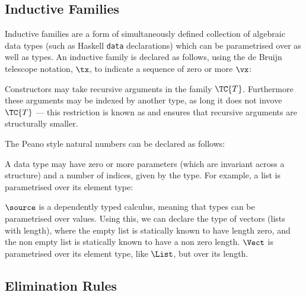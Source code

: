 \subsection{Inductive Families}

\label{indfamilies}

Inductive families \cite{dybjer94} are a form of simultaneously
defined collection of algebraic data types (such as Haskell
\texttt{data} declarations) which can be parametrised over
 as well as types.  An inductive family is declared as
follows, using the de Bruijn telescope notation, $\tx$, to indicate a
sequence of zero or more $\vx$:


Constructors may take recursive arguments in the family
$\TC{T}$. Furthermore these arguments may be indexed by another type,
as long it does not invove $\TC{T}$ --- this restriction is known as
 and ensures that recursive arguments are
structurally smaller.

The Peano style natural numbers can be declared as follows:

\DM{
\Data\:\Nat\Hab\Type\:=\:\Z\Hab\Nat\:\mid\:\suc\Hab\fbind{\vk}{\Nat}{\Nat}
}

A data type may have zero or more parameters (which are invariant
across a structure) and a number of indices, given by the type. For
example, a list is parametrised over its element type:

\DM{
\AR{
\Data\:\List\:(\vA\Hab\Type)\Hab\Type\:
\AR{
=\:\nil\Hab\List\:\vA\\
\mid\:\cons\Hab\fbind{\vx}{\vA}{\fbind{\vxs}{\List\:\vA}{\List\:\vA}}
}
}
}

$\source$ is a dependently typed calculus, meaning that types can be
parametrised over values. Using this, we can declare the type of
vectors (lists with length), where the empty list is statically known
to have length zero, and the non empty list is statically known to
have a non zero length. $\Vect$ is parametrised over its element type,
like $\List$, but  over its length.

\DM{
\AR{
\Data\:\Vect\:(\vA\Hab\Type)\Hab\Nat\to\Type\:
=\:\Vnil\Hab\Vect\:\vA\:\Z\\
\hg\hg\hg\hg\mid\:\Vcons\Hab\fbind{\vk}{\Nat}{
\fbind{\vx}{\vA}{\fbind{\vxs}{\Vect\:\vA\:\vk}{\Vect\:\vA\:(\suc\:\vk)}}
}
}
}

\subsection{Elimination Rules}

